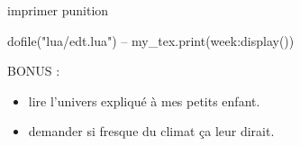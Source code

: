 \documentclass[10pt]{article}
\begin{document}
\thispagestyle{empty}

\setlength{\arrayrulewidth}{0.7mm}
\renewcommand{\arraystretch}{1.25}

imprimer punition 

\begin{luacode*}
    dofile("lua/edt.lua")
	-- my_tex.print(week:display())
\end{luacode*}

{{\Large BONUS} \normalsize : \begin{itemize}
	\item lire l'univers expliqué à mes petits enfant.
	\item demander si fresque du climat ça leur dirait.
\end{itemize}}
\end{document}
